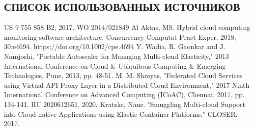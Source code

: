 \begin{center}
\section*{СПИСОК ИСПОЛЬЗОВАННЫХ ИСТОЧНИКОВ}
\end{center}
\begingroup
\renewcommand{\section}[2]{}%
\begin{thebibliography}{99}
US 9 755 858 B2, 2017.
WO 2014/021849 Al
Aktas, MS. Hybrid cloud computing monitoring software architecture. Concurrency Computat Pract Exper. 2018; 30:e4694. https://doi.org/10.1002/cpe.4694
Y. Wadia, R. Gaonkar and J. Namjoshi, "Portable Autoscaler for Managing Multi-cloud Elasticity," 2013 International Conference on Cloud \& Ubiquitous Computing \& Emerging Technologies, Pune, 2013, pp. 48-51.
M. M. Shreyas, "Federated Cloud Services using Virtual API Proxy Layer in a Distributed Cloud Environment," 2017 Ninth International Conference on Advanced Computing (ICoAC), Chennai, 2017, pp. 134-141.
RU 2020612651, 2020.
Kratzke, Nane. "Smuggling Multi-cloud Support into Cloud-native Applications using Elastic Container Platforms." CLOSER. 2017.
\end{thebibliography}
\endgroup